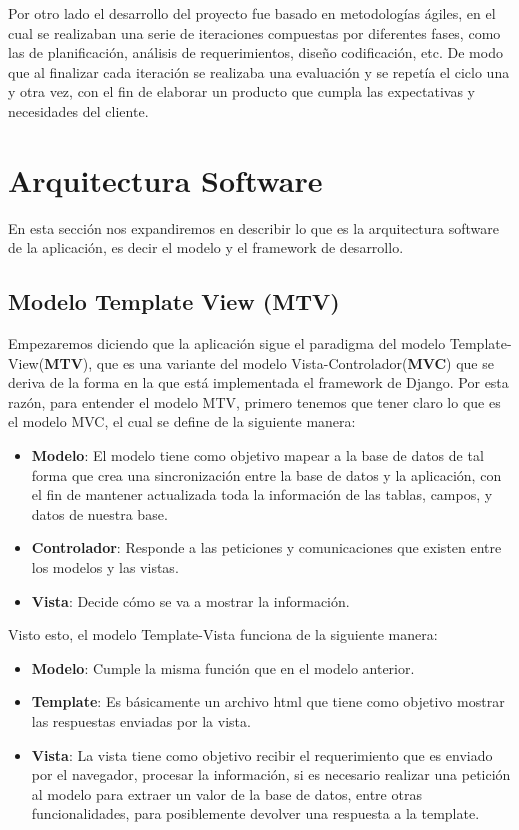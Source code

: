 Por otro lado el desarrollo del proyecto fue basado en metodologías ágiles, en el cual se realizaban una serie de iteraciones compuestas por diferentes fases, como 
las de planificación, análisis de requerimientos, diseño codificación, etc. De modo que al finalizar cada iteración se realizaba una evaluación y se repetía el ciclo una y otra vez,
con el fin de elaborar un producto que cumpla las expectativas y necesidades del cliente.\\

\section{Arquitectura Software}
\label{2:sec2}

En esta sección nos expandiremos en describir lo que es la arquitectura software de la aplicación, es decir el modelo y el framework de desarrollo.\\


\subsection{Modelo Template View (MTV)}
Empezaremos diciendo que la aplicación sigue el paradigma del modelo Template-View(\textbf{MTV}), que es una variante del modelo Vista-Controlador(\textbf{MVC}) que
se deriva de la forma en la que está implementada el framework de Django. Por esta razón, para entender el modelo MTV, primero tenemos que tener claro lo que es el modelo MVC, el cual se define de la siguiente manera:\\

\begin{itemize}
  \item \textbf{Modelo}: El modelo tiene como objetivo mapear a la base de datos de tal forma que crea una sincronización
			  entre la base de datos y la aplicación, con el fin de mantener actualizada toda la información de 
			  las tablas, campos, y datos de nuestra base. 
  \item \textbf{Controlador}: Responde a las peticiones y comunicaciones que existen entre los modelos y las vistas.
  \item \textbf{Vista}: Decide cómo se va a mostrar la información. 
\end{itemize}

Visto esto, el modelo Template-Vista funciona de la siguiente manera:\\


\begin{itemize}
  \item \textbf{Modelo}: Cumple la misma función que en el modelo anterior.
  \item \textbf{Template}: Es básicamente un archivo html que tiene como objetivo mostrar las respuestas enviadas por la vista.
  \item \textbf{Vista}: La vista tiene como objetivo recibir el requerimiento que es enviado por el navegador, procesar la información,
			 si es necesario realizar una petición al modelo para extraer un valor de la base de datos, entre otras funcionalidades, para posiblemente
			 devolver una respuesta a la template.
\end{itemize}


